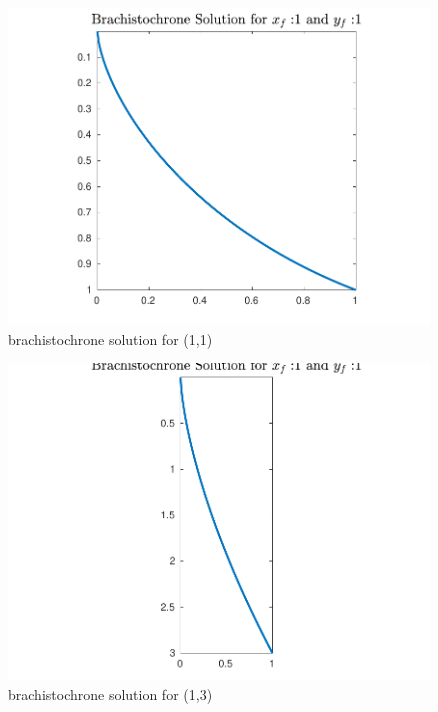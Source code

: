 \documentclass{article}
\begin{document}
\begin{figure}[H]
\centering
\includegraphics [width=4.4in]{f1}
\caption{brachistochrone solution for (1,1)}
\end{figure}
\begin{figure}[H]
\centering
\includegraphics [width=4.4in]{f2}
\caption{brachistochrone solution for (1,3)}
\end{figure}
\end{document}
